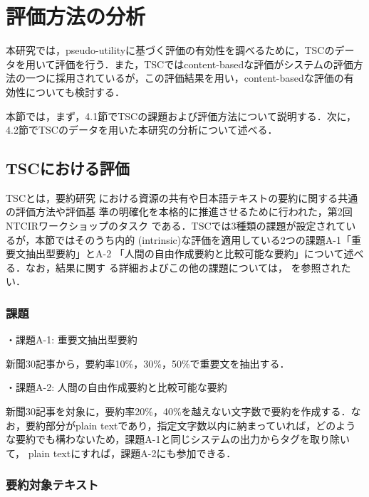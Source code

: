 \section{評価方法の分析}

本研究では，pseudo-utilityに基づく評価の有効性を調べるために，TSCのデー
タを用いて評価を行う．また，TSCではcontent-basedな評価がシステムの評価方
法の一つに採用されているが，この評価結果を用い，content-basedな評価の有
効性についても検討する．

本節では，まず，4.1節でTSCの課題および評価方法について説明する．次に，
4.2節でTSCのデータを用いた本研究の分析について述べる．




\subsection{TSCにおける評価}

TSCとは，要約研究
における資源の共有や日本語テキストの要約に関する共通の評価方法や評価基
準の明確化を本格的に推進させるために行われた，第2回NTCIRワークショップのタスク
である．TSCでは3種類の課題が設定されているが，本節ではそのうち内的
(intrinsic)な評価を適用している2つの課題A-1「重要文抽出型要約」とA-2
「人間の自由作成要約と比較可能な要約」について述べる．なお，結果に関す
る詳細およびこの他の課題については，
\cite{Fukushima:2001a,Fukushima:2001b,難波:2001}を参照されたい．

\subsubsection{課題}

\begin{flushleft}
・課題A-1: 重要文抽出型要約
\end{flushleft}

新聞30記事から，要約率10\%，30\%，50\%で重要文を抽出する．

\begin{flushleft}
・課題A-2: 人間の自由作成要約と比較可能な要約
\end{flushleft}


新聞30記事を対象に，要約率20\%，40\%を越えない文字数で要約を作成する．な
お，要約部分がplain textであり，指定文字数以内に納まっていれば，どのよう
な要約でも構わないため，課題A-1と同じシステムの出力からタグを取り除いて，
plain textにすれば，課題A-2にも参加できる．

\subsubsection{要約対象テキスト}

